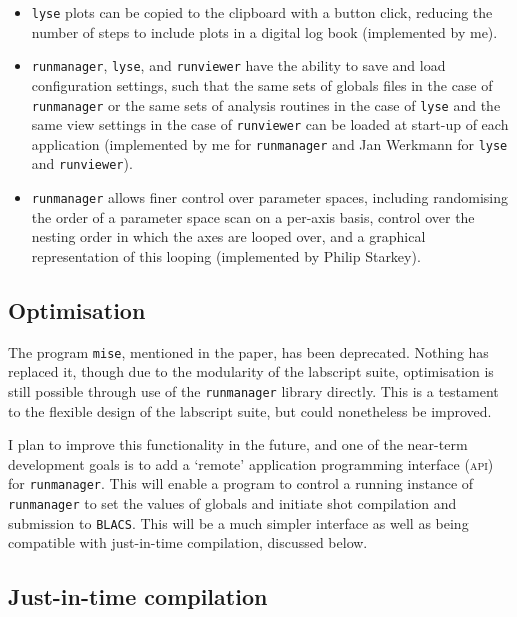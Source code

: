 \begin{itemize}
    \item \texttt{lyse} plots can be copied to the clipboard with a button click, reducing the number of steps to include plots in a digital log book (implemented by me).
    
    \item \texttt{runmanager}, \texttt{lyse}, and \texttt{runviewer} have the ability to save and load configuration settings, such that the same sets of globals files in the case of \texttt{runmanager} or the same sets of analysis routines in the case of \texttt{lyse} and the same view settings in the case of \texttt{runviewer} can be loaded at start-up of each application (implemented by me for \texttt{runmanager} and Jan Werkmann for \texttt{lyse} and \texttt{runviewer}).
    
    \item \texttt{runmanager} allows finer control over parameter spaces, including randomising the order of a parameter space scan on a per-axis basis, control over the nesting order in which the axes are looped over, and a graphical representation of this looping (implemented by Philip Starkey).
\end{itemize}

\subsection{Optimisation}

The program \texttt{mise}, mentioned in the paper, has been deprecated. Nothing has replaced it, though due to the modularity of the labscript suite, optimisation is still possible through use of the \texttt{runmanager} library directly. This is a testament to the flexible design of the labscript suite, but could nonetheless be improved.

I plan to improve this functionality in the future, and one of the near-term development goals is to add a `remote' application programming interface (\textsc{api}) for \texttt{runmanager}. This will enable a program to control a running instance of \texttt{runmanager} to set the values of globals and initiate shot compilation and submission to \texttt{BLACS}. This will be a much simpler interface as well as being compatible with just-in-time compilation, discussed below.

\subsection{Just-in-time compilation}\label{sec:jit}

